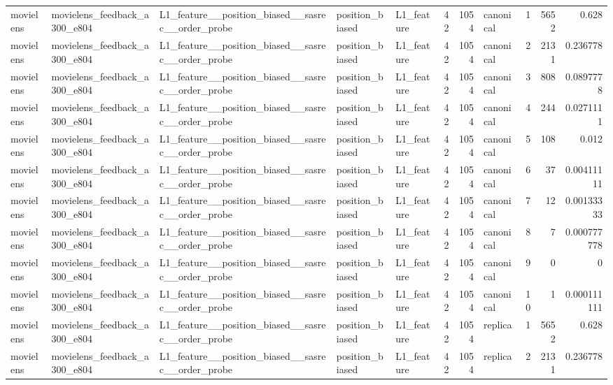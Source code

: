 \begin{table}[htbp!]
\begin{tabular}{lllllrrlrrr}
movielens & movielens\_feedback\_a300\_e804 & L1\_feature\_\_position\_biased\_\_sasrec\_\_order\_probe & position\_biased & L1\_feature & 42 & 1054 & canonical & 1 & 5652 & 0.628 \\
movielens & movielens\_feedback\_a300\_e804 & L1\_feature\_\_position\_biased\_\_sasrec\_\_order\_probe & position\_biased & L1\_feature & 42 & 1054 & canonical & 2 & 2131 & 0.236778 \\
movielens & movielens\_feedback\_a300\_e804 & L1\_feature\_\_position\_biased\_\_sasrec\_\_order\_probe & position\_biased & L1\_feature & 42 & 1054 & canonical & 3 & 808 & 0.0897778 \\
movielens & movielens\_feedback\_a300\_e804 & L1\_feature\_\_position\_biased\_\_sasrec\_\_order\_probe & position\_biased & L1\_feature & 42 & 1054 & canonical & 4 & 244 & 0.0271111 \\
movielens & movielens\_feedback\_a300\_e804 & L1\_feature\_\_position\_biased\_\_sasrec\_\_order\_probe & position\_biased & L1\_feature & 42 & 1054 & canonical & 5 & 108 & 0.012 \\
movielens & movielens\_feedback\_a300\_e804 & L1\_feature\_\_position\_biased\_\_sasrec\_\_order\_probe & position\_biased & L1\_feature & 42 & 1054 & canonical & 6 & 37 & 0.00411111 \\
movielens & movielens\_feedback\_a300\_e804 & L1\_feature\_\_position\_biased\_\_sasrec\_\_order\_probe & position\_biased & L1\_feature & 42 & 1054 & canonical & 7 & 12 & 0.00133333 \\
movielens & movielens\_feedback\_a300\_e804 & L1\_feature\_\_position\_biased\_\_sasrec\_\_order\_probe & position\_biased & L1\_feature & 42 & 1054 & canonical & 8 & 7 & 0.000777778 \\
movielens & movielens\_feedback\_a300\_e804 & L1\_feature\_\_position\_biased\_\_sasrec\_\_order\_probe & position\_biased & L1\_feature & 42 & 1054 & canonical & 9 & 0 & 0 \\
movielens & movielens\_feedback\_a300\_e804 & L1\_feature\_\_position\_biased\_\_sasrec\_\_order\_probe & position\_biased & L1\_feature & 42 & 1054 & canonical & 10 & 1 & 0.000111111 \\
movielens & movielens\_feedback\_a300\_e804 & L1\_feature\_\_position\_biased\_\_sasrec\_\_order\_probe & position\_biased & L1\_feature & 42 & 1054 & replica & 1 & 5652 & 0.628 \\
movielens & movielens\_feedback\_a300\_e804 & L1\_feature\_\_position\_biased\_\_sasrec\_\_order\_probe & position\_biased & L1\_feature & 42 & 1054 & replica & 2 & 2131 & 0.236778 \\

\end{tabular}
\end{table}
